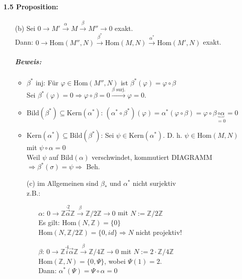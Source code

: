 \documentclass{article}
\begin{document}
	\paragraph{1.5 Proposition:}
		\begin{enumerate}
		\item[(b)]Sei $0\rightarrow M' \stackrel{\alpha}{\rightarrow} M \stackrel\beta\rightarrow M''\rightarrow 0$ exakt.\\
		Dann: $0\rightarrow \mbox{Hom}(M'', N) \stackrel{\beta^*}{\rightarrow} \mbox{Hom}(M, N) \stackrel{\alpha^*}\rightarrow \mbox{Hom}(M', N)$ exakt.
		\subparagraph{Beweis:} \begin{itemize}
			\item $\beta^*$ inj: Für $\varphi \in \mbox{Hom}(M'', N)$ ist $\beta^*(\varphi)=\varphi\circ \beta$\\
				Sei $\beta^*(\varphi)= 0 \Rightarrow \varphi \circ \beta = 0 \stackrel{\beta \mbox{ surj.}}{\rightarrow}\varphi=0$.
			\item Bild$(\beta^*) \subseteq \mbox{Kern}(\alpha^*)$: $(\alpha^* \circ \beta^*)(\varphi)= 
			\alpha^*(\varphi\circ \beta)=\varphi\circ\beta \underbrace{\circ \alpha}_{=0}=0$
			\item Kern$(\alpha^*)\subseteq\mbox{Bild}(\beta^*)$: Sei $\psi \in \mbox{Kern}(\alpha^*)$. 
			D. h. $\psi \in \mbox{Hom}(M, N)$ mit $\psi \circ\alpha=0$\\
			Weil $\psi$ auf Bild$(\alpha)$ verschwindet, kommutiert DIAGRAMM\\
			$\Rightarrow \beta^*(\sigma)= \psi \Longrightarrow$ Beh.
		\item[(c)] im Allgemeinen sind $\beta_*$ und $\alpha^*$ nicht surjektiv\\
			z.B.: \begin{enumerate}
				\item[$\alpha$:] $0\rightarrow \mathbb Z \stackrel{\cdot2}{\stackrel\rightarrow{\alpha}} 
				\mathbb Z \stackrel\beta\rightarrow \mathbb Z / 2\mathbb Z\rightarrow 0$ mit $N:= \mathbb Z / 2\mathbb Z$\\
				Es gilt: Hom$(N, \mathbb Z)=\{0\}$\\
					Hom$(N, \mathbb Z/2\mathbb Z)=\{0, id\}  \Longrightarrow  N$ nicht projektiv!
				\item[$\beta$:] $0\rightarrow \mathbb Z \stackrel{\cdot4}i{\stackrel\rightarrow{\alpha}} 
				\mathbb Z \stackrel\beta\rightarrow \mathbb Z / 4\mathbb Z\rightarrow 0$ mit $N:= 2\cdot \mathbb Z / 4\mathbb Z$\\
				Hom$(\mathbb Z, N)= \{0, \Psi\}$, wobei $\Psi(1)=2$.\\
				Dann: $\alpha^*(\Psi)=\Psi\circ \alpha = 0$
				\end{enumerate}
			\end{itemize}
		\end{enumerate}
\end{document}

